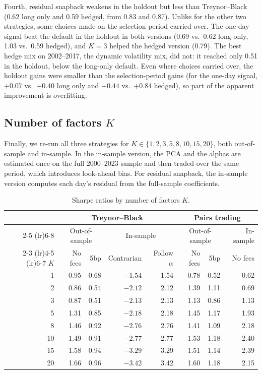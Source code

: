 \documentclass[11pt]{article}
\begin{document}
Fourth, residual snapback weakens in the holdout but less than Treynor--Black (0.62 long only and 0.59 hedged, from 0.83 and 0.87). Unlike for the other two strategies, some choices made on the selection period carried over. The one-day signal beat the default in the holdout in both versions (0.69 vs.\ 0.62 long only, 1.03 vs.\ 0.59 hedged), and $K = 3$ helped the hedged version (0.79). The best hedge mix on 2002--2017, the dynamic volatility mix, did not: it reached only 0.51 in the holdout, below the long-only default. Even where choices carried over, the holdout gains were smaller than the selection-period gains (for the one-day signal, $+0.07$ vs.\ $+0.40$ long only and $+0.44$ vs.\ $+0.84$ hedged), so part of the apparent improvement is overfitting.

\subsection{Number of factors $K$}

Finally, we re-run all three strategies for $K \in \{1, 2, 3, 5, 8, 10, 15, 20\}$, both out-of-sample and in-sample. In the in-sample version, the PCA and the alphas are estimated once on the full 2000--2023 sample and then traded over the same period, which introduces look-ahead bias. For residual snapback, the in-sample version computes each day's residual from the full-sample coefficients.

\begin{table}[H]
\centering
\caption{Sharpe ratios by number of factors $K$.}
\label{tab:k}
\begin{tabular}{rrrrrrrr}
\toprule
& \multicolumn{4}{c}{Treynor--Black} & \multicolumn{3}{c}{Pairs trading} \\
\cmidrule(lr){2-5} \cmidrule(lr){6-8}
& \multicolumn{2}{c}{Out-of-sample} & \multicolumn{2}{c}{In-sample} & \multicolumn{2}{c}{Out-of-sample} & In-sample \\
\cmidrule(lr){2-3} \cmidrule(lr){4-5} \cmidrule(lr){6-7}
$K$ & No fees & 5bp & Contrarian & Follow $\alpha$ & No fees & 5bp & No fees \\
\midrule
1 & 0.95 & 0.68 & $-1.54$ & 1.54 & 0.78 & 0.52 & 0.62 \\
2 & 0.86 & 0.54 & $-2.12$ & 2.12 & 1.39 & 1.11 & 0.69 \\
3 & 0.87 & 0.51 & $-2.13$ & 2.13 & 1.13 & 0.86 & 1.13 \\
5 & 1.31 & 0.85 & $-2.18$ & 2.18 & 1.45 & 1.17 & 1.93 \\
8 & 1.46 & 0.92 & $-2.76$ & 2.76 & 1.41 & 1.09 & 2.18 \\
10 & 1.49 & 0.91 & $-2.77$ & 2.77 & 1.53 & 1.18 & 2.40 \\
15 & 1.58 & 0.94 & $-3.29$ & 3.29 & 1.51 & 1.14 & 2.39 \\
20 & 1.66 & 0.96 & $-3.42$ & 3.42 & 1.60 & 1.18 & 2.15 \\
\bottomrule
\end{tabular}
\end{table}
\end{document}
